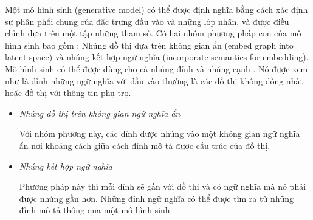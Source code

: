 Một mô hình sinh (generative model) có thể được định nghĩa bằng cách xác định sư phân phối chung của đặc trưng đầu vào và những lớp nhãn, và được điều chỉnh dựa trên một tập những tham số. Có hai nhóm phương pháp con của mô hình sinh bao gồm : Nhúng đồ thị dựa trên không gian ẩn (embed graph into latent space) và nhúng kết hợp ngữ nghĩa (incorporate semantics for embedding).
Mô hình sinh có thể được dùng cho cả nhúng đỉnh và nhúng cạnh . Nó được xem như là đỉnh những ngữ nghĩa với đầu vào thường là các đồ thị không đồng nhất hoặc đồ thị với thông tin phụ trợ.
\begin{itemize}
	\item \textit{Nhúng đồ thị trên không gian ngữ nghĩa ẩn}
	
	Với nhóm phương này, các đỉnh được nhúng vào một không gian ngữ nghĩa ẩn nơi khoảng cách giữa cách đỉnh mô tả được cấu trúc của đồ thị.
	
	\item \textit{Nhúng kết hợp ngữ nghĩa}
	
	Phương pháp này thì mỗi đỉnh sẽ gần với đồ thị và có ngữ nghĩa mà nó phải được nhúng gần hơn. Những đỉnh ngữ nghĩa có thể được tìm ra từ những đỉnh mô tả thông qua một mô hình sinh.
	
\end{itemize}


